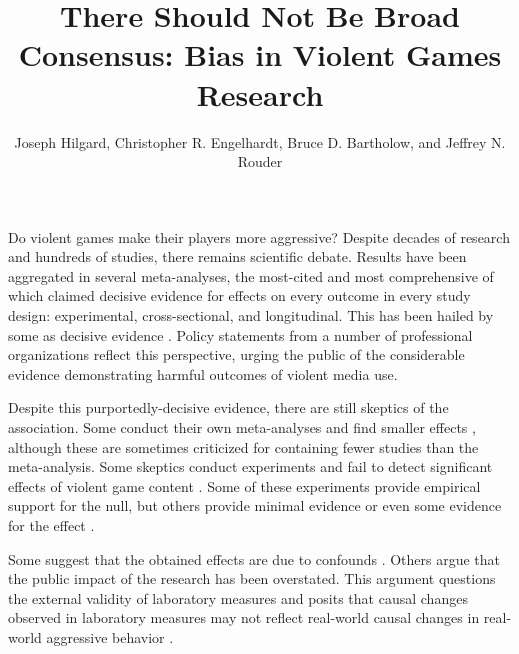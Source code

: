 \documentclass[man]{apa6}
\author{Joseph Hilgard, Christopher R. Engelhardt, Bruce D. Bartholow, and Jeffrey N. Rouder}
\title{There Should Not Be Broad Consensus: Bias in Violent Games Research}
\affiliation{University of Missouri}
\begin{document}
\maketitle

Do violent games make their players more aggressive? Despite decades of research and hundreds of studies, there remains scientific debate. Results have been aggregated in several meta-analyses, the most-cited and most comprehensive of which \citep{Anderson:etal:2010} claimed decisive evidence for effects on every outcome in every study design: experimental, cross-sectional, and longitudinal. 
This has been hailed by some as decisive evidence \citep{Bushman:etal:2010,Huesmann:2010,Huesmann:2014}. 
Policy statements from a number of professional organizations \citep[][e.g.,]{AAP:2009} reflect this perspective, urging the public of the considerable evidence demonstrating harmful outcomes of violent media use.


Despite this purportedly-decisive evidence, there are still skeptics of the association.
Some conduct their own meta-analyses and find smaller effects \citep{Ferguson:2007a,Ferguson:2007b,Ferguson:InPress,Sherry:2001}, although these are sometimes criticized for containing fewer studies than the \citet{Anderson:etal:2010} meta-analysis. %
Some skeptics conduct experiments and fail to detect significant effects of violent game content \citep{Adachi:Willoughby:2011,Elson:etal:2013,Ferguson:etal:2008,Valadez:Ferguson:2012}. Some of these experiments provide empirical support for the null, but others provide minimal evidence or even some evidence for the effect \citep{Hilgard:etal:2014}.

Some suggest that the obtained effects are due to confounds \citep{Adachi:Willoughby:2011b;Elson:etal:2013}. Others argue that the public impact of the research has been overstated. This argument questions the external validity of laboratory measures and posits that causal changes observed in laboratory measures may not reflect real-world causal changes in real-world aggressive behavior \citep{Elson:Ferguson:2014}. %
\end{document}
